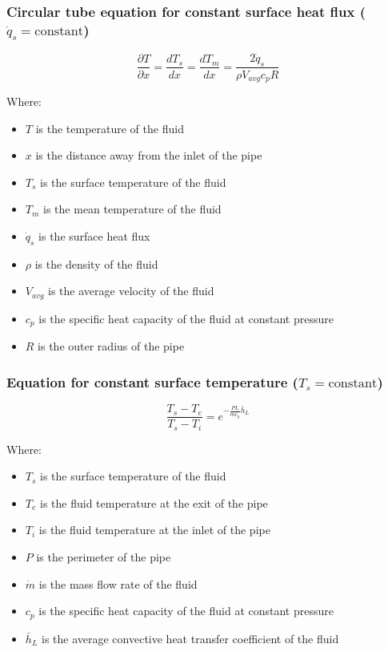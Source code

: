 \documentclass[11pt]{article}
\begin{document}
 \newpage
\subsubsection{Circular tube equation for constant surface heat flux (\(\dot{q}_s = \text{constant}\))}
\label{sec:org0f1426d}
\[\frac{\partial T}{\partial x} = \frac{dT_s}{dx} = \frac{dT_m}{dx} = \frac{2 \dot{q}_s}{\rho V_{avg} c_p R}\]

Where:
\begin{itemize}
\item \(T\) is the temperature of the fluid
\item \(x\) is the distance away from the inlet of the pipe
\item \(T_s\) is the surface temperature of the fluid
\item \(T_m\) is the mean temperature of the fluid
\item \(\dot{q}_s\) is the surface heat flux
\item \(\rho\) is the density of the fluid
\item \(V_{avg}\) is the average velocity of the fluid
\item \(c_p\) is the specific heat capacity of the fluid at constant pressure
\item \(R\) is the outer radius of the pipe
\end{itemize}
\subsubsection{Equation for constant surface temperature (\(T_s = \text{constant}\))}
\label{sec:org5669734}
\[\frac{T_s - T_e}{T_s - T_i} = e^{-\frac{PL}{\dot{m} c_p} \bar{h}_L}\]

Where:
\begin{itemize}
\item \(T_s\) is the surface temperature of the fluid
\item \(T_e\) is the fluid temperature at the exit of the pipe
\item \(T_i\) is the fluid temperature at the inlet of the pipe
\item \(P\) is the perimeter of the pipe
\item \(\dot{m}\) is the mass flow rate of the fluid
\item \(c_p\) is the specific heat capacity of the fluid at constant pressure
\item \(\bar{h}_L\) is the average convective heat transfer coefficient of the fluid
\end{itemize}
\end{document}

